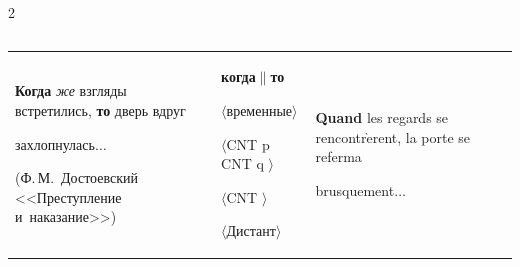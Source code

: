 \begin{multicols}{2}
\begin{enumerate}[(1)]
\begin{table}
\begin{center}
\begin{tabular}{|l|c|c|c|}
\end{tabular}


\end{center}






\begin{center}




\vspace*{2ex}





\tabcolsep=8pt


\begin{tabular}{|p{57mm}|p{23mm}|p{38mm}|p{25mm}|}


\hline


\textbf{Когда} \textit{же} взгляды встретились, \textbf{то} дверь вдруг 


захлопнулась$\ldots$\newline


\newline


\newline


\newline


\newline


(Ф.\,М.~Достоевский <<Преступление и~на\-ка\-за\-ние>>)  &


 \textbf{когда}$\|$\textbf{то}\newline


$\langle$временные$\rangle$\newline


$\langle$CNT p CNT q $\rangle$\newline


$\langle$CNT $\rangle$\newline


$\langle$Дистант$\rangle$ &


\textbf{Quand} les regards se rencontr$\grave{\mbox{e}}$rent, la porte se referma 


brusquement$\ldots$\newline


\newline



\end{tabular}
\end{center}
\end{table}
\end{enumerate}
\end{multicols}
